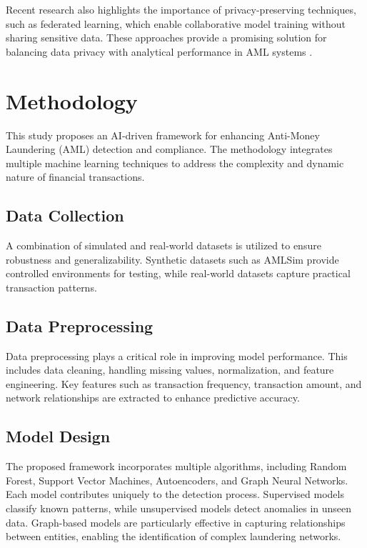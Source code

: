 \documentclass[twoside,twocolumn,10pt]{article}
\begin{document}
Recent research also highlights the importance of privacy-preserving techniques, such as federated learning, which enable collaborative model training without sharing sensitive data. These approaches provide a promising solution for balancing data privacy with analytical performance in AML systems \cite{ref11}.

\section{Methodology}
\fontsize{11}{13}\selectfont

This study proposes an AI-driven framework for enhancing Anti-Money Laundering (AML) detection and compliance. The methodology integrates multiple machine learning techniques to address the complexity and dynamic nature of financial transactions.

\subsection{Data Collection}
A combination of simulated and real-world datasets is utilized to ensure robustness and generalizability. Synthetic datasets such as AMLSim provide controlled environments for testing, while real-world datasets capture practical transaction patterns.

\subsection{Data Preprocessing}
Data preprocessing plays a critical role in improving model performance. This includes data cleaning, handling missing values, normalization, and feature engineering. Key features such as transaction frequency, transaction amount, and network relationships are extracted to enhance predictive accuracy.

\subsection{Model Design}
The proposed framework incorporates multiple algorithms, including Random Forest, Support Vector Machines, Autoencoders, and Graph Neural Networks. Each model contributes uniquely to the detection process. Supervised models classify known patterns, while unsupervised models detect anomalies in unseen data. Graph-based models are particularly effective in capturing relationships between entities, enabling the identification of complex laundering networks.
\end{document}

